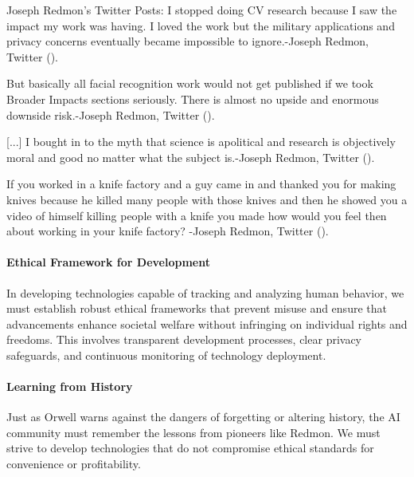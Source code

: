 \begin{myquote} {Joseph Redmon's Twitter Posts:}
    I stopped doing CV research because I saw the impact my work was having. I loved the work but the military applications and privacy concerns eventually became impossible to ignore.-Joseph Redmon, Twitter (\cite{re2020twitter_feb}).

    But basically all facial recognition work would not get published if we took Broader Impacts sections seriously. There is almost no upside and enormous downside risk.-Joseph Redmon, Twitter (\cite{re2020twitter_feb}).

    [...] I bought in to the myth that science is apolitical and research is objectively moral and good no matter what the subject is.-Joseph Redmon, Twitter (\cite{re2020twitter_feb}).


    If you worked in a knife factory and a guy came in and thanked you for making knives because he killed many people with those knives and then he showed you a video of himself killing people with a knife you made how would you feel then about working in your knife factory? -Joseph Redmon, Twitter (\cite{re2020twitter_june}).
\end{myquote}



\paragraph{Ethical Framework for Development}
In developing technologies capable of tracking and analyzing human behavior, we must establish robust ethical frameworks that prevent misuse and ensure that advancements enhance societal welfare without infringing on individual rights and freedoms. This involves transparent development processes, clear privacy safeguards, and continuous monitoring of technology deployment.

\paragraph{Learning from History}
Just as Orwell warns against the dangers of forgetting or altering history, the AI community must remember the lessons from pioneers like Redmon. We must strive to develop technologies that do not compromise ethical standards for convenience or profitability.

